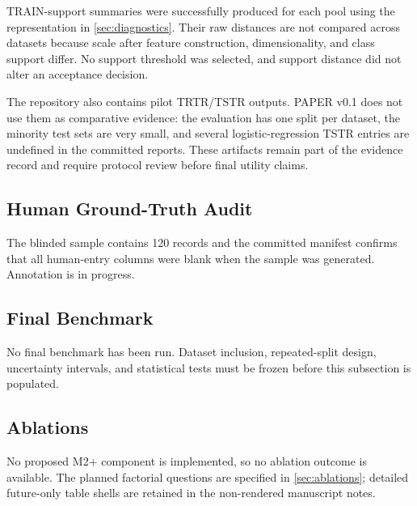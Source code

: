 TRAIN-support summaries were successfully produced for each pool using the
representation in \cref{sec:diagnostics}. Their raw distances are not compared
across datasets because scale after feature construction, dimensionality, and
class support differ. No support threshold was selected, and support distance
did not alter an acceptance decision.

The repository also contains pilot TRTR/TSTR outputs. PAPER v0.1 does not use
them as comparative evidence: the evaluation has one split per dataset, the
minority test sets are very small, and several logistic-regression TSTR entries
are undefined in the committed reports. These artifacts remain part of the
evidence record and require protocol review before final utility claims.

\subsection{Human Ground-Truth Audit}
\label{sec:human-results}

The blinded sample contains 120 records and the committed manifest confirms
that all human-entry columns were blank when the sample was generated.
Annotation is in progress.


\subsection{Final Benchmark}
\label{sec:final-benchmark-results}

No final benchmark has been run. Dataset inclusion, repeated-split design,
uncertainty intervals, and statistical tests must be frozen before this
subsection is populated.


\subsection{Ablations}
\label{sec:results-ablations}

No proposed M2+ component is implemented, so no ablation outcome is available.
The planned factorial questions are specified in \cref{sec:ablations}; detailed
future-only table shells are retained in the non-rendered manuscript notes.


